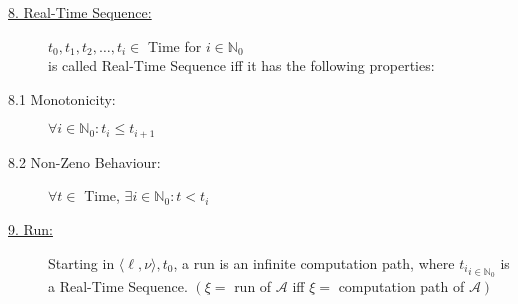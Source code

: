 \begin{tcolorbox}
\begin{description}
\item[\uline{8. Real-Time Sequence:}] $t_0, t_1, t_2, \ldots, t_i \in$ Time for $i \in \mathbb{N}_0$\\
is called Real-Time Sequence iff it has the following properties:
\item[8.1 Monotonicity:] $\forall i \in \mathbb{N}_0: t_i \leq t_{i+1}$
\item[8.2 Non-Zeno Behaviour:] $\forall t \in$ Time, $\exists i \in \mathbb{N}_0 : t < t_i$\\

\item[\uline{9. Run:}] Starting in $\langle \ell, \nu \rangle, t_0$, a run is an infinite computation path, where ${t_{i}}_{i \in \mathbb{N}_0}$ is a Real-Time Sequence. \hfill $\left( \xi =\right.$ run of $\mathcal{A}$ \hfill iff $\xi =$ computation path of $\left. \mathcal{A}\right)$
\end{description}
\end{tcolorbox}


